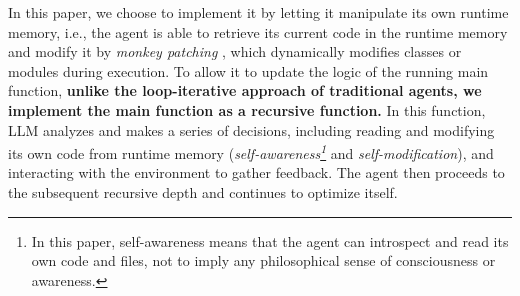 In this paper, we choose to implement it by letting it manipulate its own runtime memory, i.e., the agent is able to retrieve its current code in the runtime memory and modify it by \textit{monkey patching} \citep{archiveMonkeyPatching}, which dynamically modifies classes or modules during execution.
To allow it to update the logic of the running main function, \textbf{unlike the loop-iterative approach of traditional agents, we implement the main function as a recursive function.}
In this function, LLM analyzes and makes a series of decisions, including reading and modifying its own code from runtime memory (\textit{self-awareness\footnote{In this paper, self-awareness means that the agent can introspect and read its own code and files, not to imply any philosophical sense of consciousness or awareness.}} and \textit{self-modification}), and interacting with the environment to gather feedback. The agent then proceeds to the subsequent recursive depth and continues to optimize itself. 


